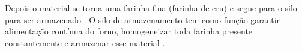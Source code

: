  	\begin{figure}[h!] 
   	    \captionsetup{width=16cm}%
	\end{figure}

 \pagebreak

Depois o material se torna uma farinha fina (farinha de cru) e segue para o silo para ser armazenado \cite{Andre2011}. O silo de armazenamento tem como função garantir alimentação contínua do forno, homogeneizar toda farinha presente constantemente e armazenar esse material \cite{Carvalho2023}.

 	\begin{figure}[h!] 
   	    \captionsetup{width=6cm}%
	\end{figure}

